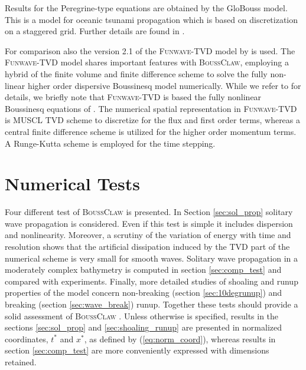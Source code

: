 \documentclass[review]{elsarticle}
\newcommand{\BoussClaw}{\textsc{BoussClaw} }
\newcommand{\BoussClawt}{\textsc{BoussClaw}}
\begin{document}
Results for the Peregrine-type equations are obtained by the
GloBouss model. This is a model for oceanic tsunami propagation which
is based on  discretization on a staggered grid. Further details are found in 
\citet{Lovholt:2008b}.

For comparison also the version 2.1 of the  \textsc{Funwave-TVD} model
by \citet{shi2012high} is used. The
\textsc{Funwave-TVD} model shares important features with \BoussClawt, employing a hybrid 
of the finite volume and finite difference
scheme to solve the fully non-linear higher order dispersive Boussinesq model numerically.
While we refer to \citet{shi2012high} for details, we briefly note that \textsc{Funwave-TVD} is based the fully nonlinear 
Boussinesq equations of \citet{Chen06}. The numerical spatial representation in \textsc{Funwave-TVD} is MUSCL TVD scheme 
to discretize for the flux and first order terms, 
whereas a central finite difference
scheme \citep{Wei95} is utilized for the higher order momentum terms. A Runge-Kutta scheme is employed for the time stepping.

\section{Numerical Tests}
\label{sec:num_tests}
Four different test of \BoussClaw is presented.  
In Section \ref{sec:sol_prop} solitary wave propagation is considered.
Even if this test is simple it includes dispersion and nonlinearity. 
Moreover, a scrutiny of the variation of energy with time and resolution  shows that the artificial dissipation induced by the TVD part of the numerical scheme
 is very small for smooth waves.
Solitary wave propagation in a moderately complex bathymetry is
computed in  section \ref{sec:comp_test} and compared with experiments.
Finally, more detailed studies of shoaling and runup properties
of the model concern non-breaking (section \ref{sec:10degrunup}) and 
breaking (section \ref{sec:wave_break}) runup. Together these
tests should provide a solid assessment of  \BoussClaw. Unless otherwise 
is specified, results in  the sections 
  \ref{sec:sol_prop}    and \ref{sec:shoaling_runup} are presented  in 
normalized coordinates, $t^*$ and $x^*$, as defined by (\ref{eq:norm_coord}),
whereas results in section \ref{sec:comp_test} are more conveniently expressed with 
dimensions retained.
\end{document}
